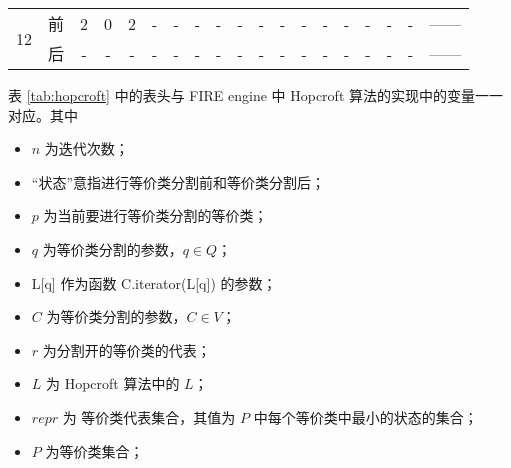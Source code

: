 \begin{table}[!htbp]
\begin{tabular}{ccccccc|cccccccccc|cl}
        \multirow{2}{*}{12}& 前 & 2 & 0 & 2 & - & -  & - & - & - & - & - & - & - & - & - & - & -             & ------ \\
                           & 后 & - & - & - & - & -  & - & - & - & - & - & - & - & - & - & - & -             & ------ \\
        \bottomrule%
    \end{tabular}
\end{table}

表 \ref{tab:hopcroft} 中的表头与 FIRE engine 中 Hopcroft 算法的实现中的变量一一对应。其中
\begin{itemize}
    \item $n$ 为迭代次数；
    \item “状态”意指进行等价类分割前和等价类分割后；
    \item $p$ 为当前要进行等价类分割的等价类；
    \item $q$ 为等价类分割的参数，$q \in Q$；
    \item L[q] 作为函数 C.iterator(L[q]) 的参数；
    \item $C$ 为等价类分割的参数，$C \in V$；
    \item $r$ 为分割开的等价类的代表；
    \item $L$ 为 Hopcroft 算法中的 $L$；
    \item $repr$ 为 等价类代表集合，其值为 $P$ 中每个等价类中最小的状态的集合；
    \item $P$ 为等价类集合；
\end{itemize}